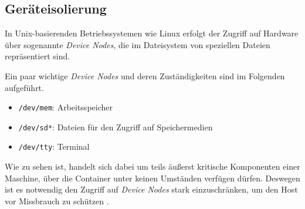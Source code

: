 \documentclass[../main.tex]{subfiles}
\begin{document}
		\subsection{Geräteisolierung}

			In Unix-basierenden Betriebssystemen wie Linux erfolgt der Zugriff auf Hardware über sogenannte \emph{Device Nodes}, die im Dateisystem von speziellen Dateien repräsentiert sind.

			Ein paar wichtige \emph{Device Nodes} und deren Zuständigkeiten sind im Folgenden aufgeführt.

			\begin{itemize}
				\item \texttt{/dev/mem}: Arbeitsspeicher
				\item \texttt{/dev/sd*}: Dateien für den Zugriff auf Speichermedien
				\item \texttt{/dev/tty}: Terminal
			\end{itemize}

			Wie zu sehen ist, handelt sich dabei um teils äußerst kritische Komponenten einer Maschine, über die Container unter keinen Umständen verfügen dürfen. Deswegen ist es notwendig den Zugriff auf \emph{Device Nodes} stark einzuschränken, um den Host vor Missbrauch zu schützen \cite[S.4]{dockerSec1}.





\end{document}
